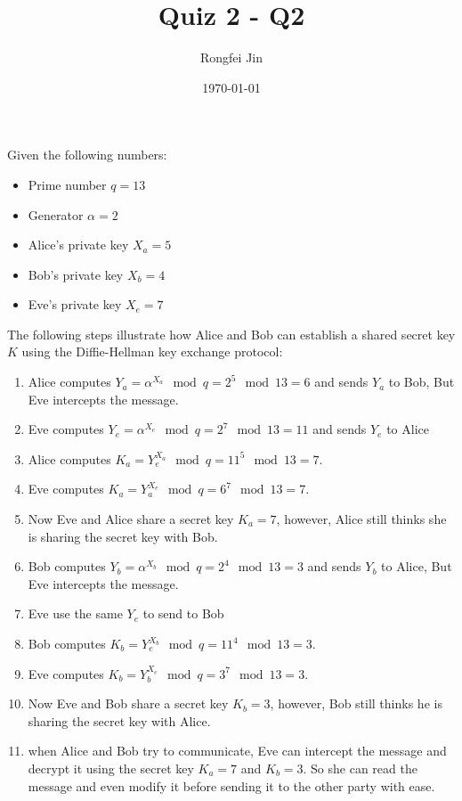 \documentclass{article}
\author{Rongfei Jin}
\title{Quiz 2 - Q2}
\date{\today}
\begin{document}
Given the following numbers:
\begin{itemize}
\item Prime number $q=13$
\item Generator $\alpha=2$
\item Alice's private key $X_a=5$
\item Bob's private key $X_b=4$
\item Eve's private key $X_e=7$
\end{itemize}

The following steps illustrate how Alice and Bob can establish a shared secret key $K$ using the Diffie-Hellman key exchange protocol:

\begin{enumerate}
    \item Alice computes $Y_a = \alpha^{X_a} \mod q = 2^5 \mod 13 = 6$ and sends $Y_a$ to Bob, But Eve intercepts the message.
    \item Eve computes $Y_e = \alpha^{X_e} \mod q = 2^7 \mod 13 = 11$ and sends $Y_e$ to Alice
    \item Alice computes $K_a = Y_e^{X_a} \mod q = 11^5 \mod 13 = 7$.
    \item Eve computes $K_a = Y_a^{X_e} \mod q = 6^7 \mod 13 = 7$.
    \item Now Eve and Alice share a secret key $K_a=7$, however, Alice still thinks she is sharing the secret key with Bob.

    \item Bob computes $Y_b = \alpha^{X_b} \mod q = 2^4 \mod 13 = 3$ and sends $Y_b$ to Alice, But Eve intercepts the message.
    \item Eve use the same $Y_e$ to send to Bob
    \item Bob computes $K_b = Y_e^{X_b} \mod q = 11^4 \mod 13 = 3$.
    \item Eve computes $K_b = Y_b^{X_e} \mod q = 3^7 \mod 13 = 3$.
    \item Now Eve and Bob share a secret key $K_b=3$, however, Bob still thinks he is sharing the secret key with Alice.

    \item when Alice and Bob try to communicate, Eve can intercept the message and decrypt it using the secret key $K_a=7$ and $K_b=3$. So she can read the message and even modify it before sending it to the other party with ease.

\end{enumerate}
\end{document}
